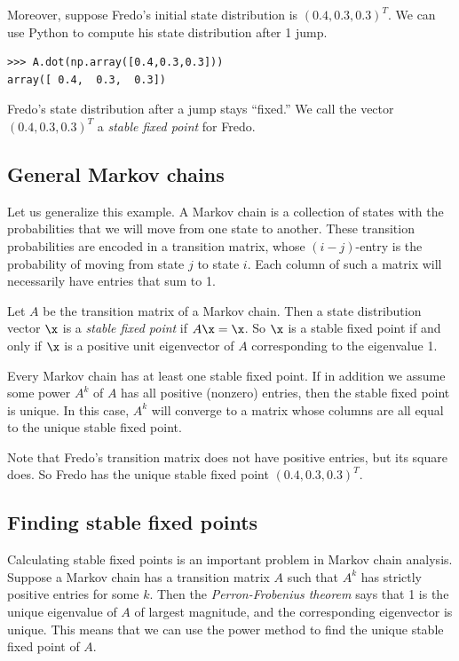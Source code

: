 Moreover, suppose Fredo's initial state distribution is $(0.4, 0.3, 0.3)^T$. 
We can use Python to compute his state distribution after 1 jump.
\begin{lstlisting}
>>> A.dot(np.array([0.4,0.3,0.3]))
array([ 0.4,  0.3,  0.3])
\end{lstlisting} 
Fredo's state distribution after a jump stays ``fixed.'' We call the vector $(0.4, 0.3, 0.3)^T$ a \emph{stable fixed point} for Fredo.


\subsection*{General Markov chains}
Let us generalize this example. A Markov chain is a collection of states with the probabilities that we will move from one state to another. 
These transition probabilities are encoded in a transition matrix, whose $(i-j)$-entry is the probability of moving from state $j$ to state $i$. 
Each column of such a matrix will necessarily have entries that sum to 1. 


Let $A$ be the transition matrix of a Markov chain. 
Then a state distribution vector $\x$ is a \emph{stable fixed point} if $A\x=\x$. 
So $\x$ is a stable fixed point if and only if $\x$ is a positive unit eigenvector of $A$ corresponding to the eigenvalue 1. 


Every Markov chain has at least one stable fixed point. 
If in addition we assume some power $A^k$ of $A$ has all positive (nonzero) entries, then the stable fixed point is unique. 
In this case, $A^k$ will converge to a matrix whose columns are all equal to the unique stable fixed point.

Note that Fredo's transition matrix does not have positive entries, but its square does. 
So Fredo has the unique stable fixed point $(0.4, 0.3, 0.3)^T$.

\subsection*{Finding stable fixed points}
Calculating stable fixed points is an important problem in Markov chain analysis. 
Suppose a Markov chain has a transition matrix $A$ such that $A^k$ has strictly positive entries for some $k$. 
Then the \emph{Perron-Frobenius theorem} says that 1 is the unique eigenvalue of $A$ of largest magnitude, and the corresponding eigenvector is unique. 
This means that we can use the power method to find the unique stable fixed point of $A$.


